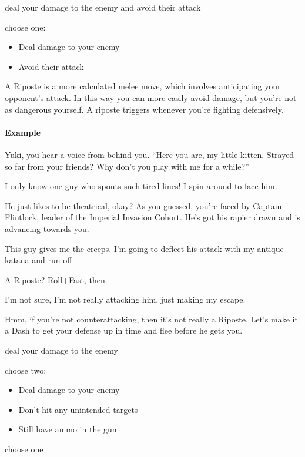 {deal your damage to the enemy and avoid their attack}
{choose one:
\begin{itemize}
\item Deal damage to your enemy
\item Avoid their attack
\end{itemize}}

A Riposte is a more calculated melee move, which involves anticipating
your opponent's attack. In this way you can more easily avoid damage,
but you're not as dangerous yourself. A riposte triggers whenever
you're fighting defensively.

\paragraph{Example}
\begin{dialogue}
   Yuki, you hear a voice from behind you. ``Here you are,
  my little kitten. Strayed so far from your friends? Why don't you
  play with me for a while?''
  
   I only know one guy who spouts such tired lines! I spin
  around to face him.

   He just likes to be theatrical, okay? As you guessed,
  you're faced by Captain Flintlock, leader of the Imperial Invasion
  Cohort. He's got his rapier drawn and is advancing towards you.

   This guy gives me the creeps. I'm going to deflect his
  attack with my antique katana and run off.

   A Riposte? Roll+Fast, then.

   I'm not sure, I'm not really attacking him, just making
  my escape.

   Hmm, if you're not counterattacking, then it's not really
  a Riposte. Let's make it a Dash to get your defense up in
  time and flee before he gets you.
\end{dialogue}

{deal your damage to the enemy}
{choose two:
\begin{itemize}
\item Deal damage to your enemy
\item Don't hit any unintended targets
\item Still have ammo in the gun
\end{itemize}}
{choose one}

